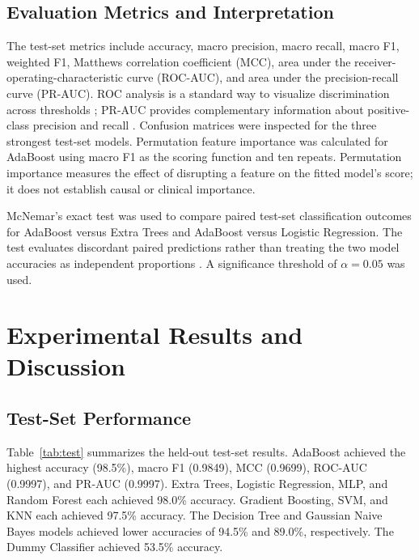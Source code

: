 \documentclass[conference]{IEEEtran}
\begin{document}
\subsection{Evaluation Metrics and Interpretation}
The test-set metrics include accuracy, macro precision, macro recall, macro F1, weighted F1, Matthews correlation coefficient (MCC), area under the receiver-operating-characteristic curve (ROC-AUC), and area under the precision-recall curve (PR-AUC). ROC analysis is a standard way to visualize discrimination across thresholds \cite{fawcett2006roc}; PR-AUC provides complementary information about positive-class precision and recall \cite{saito2015pr}. Confusion matrices were inspected for the three strongest test-set models. Permutation feature importance was calculated for AdaBoost using macro F1 as the scoring function and ten repeats. Permutation importance measures the effect of disrupting a feature on the fitted model's score; it does not establish causal or clinical importance.

McNemar's exact test was used to compare paired test-set classification outcomes for AdaBoost versus Extra Trees and AdaBoost versus Logistic Regression. The test evaluates discordant paired predictions rather than treating the two model accuracies as independent proportions \cite{mcnemar1947}. A significance threshold of $\alpha=0.05$ was used.

\section{Experimental Results and Discussion}
\subsection{Test-Set Performance}
Table~\ref{tab:test} summarizes the held-out test-set results. AdaBoost achieved the highest accuracy (98.5\%), macro F1 (0.9849), MCC (0.9699), ROC-AUC (0.9997), and PR-AUC (0.9997). Extra Trees, Logistic Regression, MLP, and Random Forest each achieved 98.0\% accuracy. Gradient Boosting, SVM, and KNN each achieved 97.5\% accuracy. The Decision Tree and Gaussian Naive Bayes models achieved lower accuracies of 94.5\% and 89.0\%, respectively. The Dummy Classifier achieved 53.5\% accuracy.
\end{document}
